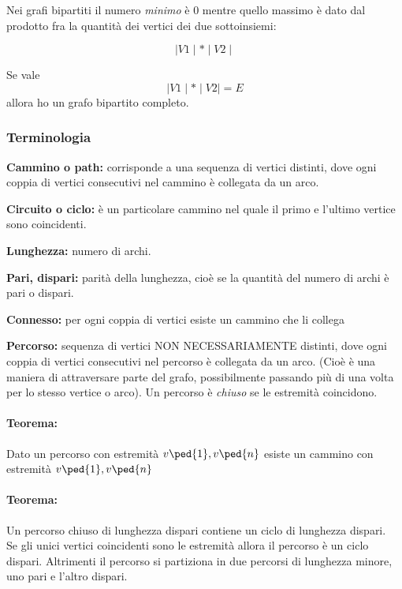 \documentclass[12pt,a4paper]{article}
\begin{document}
    Nei grafi bipartiti il numero \emph{minimo} è 0 mentre quello massimo è dato dal prodotto fra la quantità dei vertici dei due sottoinsiemi:

    \begin{equation}
    \mid V1 \mid * \mid V2 \mid
    \end{equation}

    Se vale \[ \mid V1 \mid * \mid V2 \mid =E \] allora ho un grafo bipartito completo.

\subsubsection{Terminologia}

\textbf{Cammino o path:} corrisponde a una sequenza di vertici distinti, dove ogni coppia di vertici consecutivi nel cammino è collegata da un arco. \par
\textbf{Circuito o ciclo:} è un particolare cammino nel quale il primo e l'ultimo vertice sono coincidenti. \par
\textbf{Lunghezza:} numero di archi.\par
\textbf{Pari, dispari:} parità della lunghezza, cioè se la quantità del numero di archi è pari o dispari. \par
\textbf{Connesso:} per ogni coppia di vertici esiste un
cammino che li collega \par
\textbf{Percorso:} sequenza di vertici \textsc{NON NECESSARIAMENTE} distinti, dove ogni coppia di vertici
consecutivi nel percorso è collegata da un arco. (Cioè è una maniera di attraversare parte del
grafo, possibilmente passando più di una volta per lo stesso vertice o arco). Un percorso è \emph{chiuso}
se le estremità coincidono. \\

\paragraph{Teorema:} Dato un percorso con estremità \( v\ped{1}, v\ped{n} \) esiste un cammino con estremità \( v\ped{1}, v\ped{n} \) \par
\paragraph{Teorema:} Un percorso chiuso di lunghezza dispari contiene un ciclo di lunghezza dispari. \\
Se gli unici vertici coincidenti sono le estremità allora il percorso è un ciclo dispari. Altrimenti il percorso si partiziona in due percorsi di lunghezza minore, uno pari e l'altro dispari. \par
\end{document}
